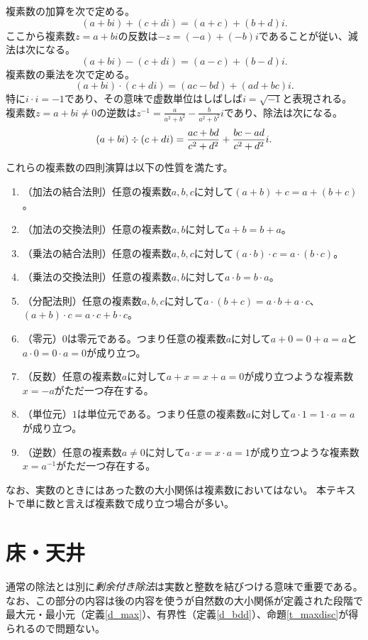 複素数の加算を次で定める。
$$
(a+b i)+(c+d i) = (a+c)+(b+d)i.
$$
ここから複素数$z = a+b i$の反数は$-z = (-a)+(-b)i$であることが従い、減法は次になる。
$$
(a+b i)-(c+d i) = (a-c)+(b-d)i.
$$
複素数の乗法を次で定める。
$$
(a+b i)\cdot(c+d i) = (a c-b d)+(a d+b c)i.
$$
特に$i\cdot i = -1$であり、その意味で虚数単位はしばしば$i = \sqrt{-1}$と表現される。
複素数$z = a+b i \ne 0$の逆数は$z^{-1} = \frac{a}{a^2+b^2}-\frac{b}{a^2+b^2}i$であり、除法は次になる。
$$
(a+b i)\divs(c+d i) = \frac{a c+b d}{c^2+d^2}+\frac{b c-a d}{c^2+d^2}i.
$$

これらの複素数の四則演算は以下の性質を満たす。
\begin{enumerate}
\item
（加法の結合法則）任意の複素数$a, b, c$に対して$(a+b)+c = a+(b+c)$。
\item
（加法の交換法則）任意の複素数$a, b$に対して$a+b = b+a$。
\item
（乗法の結合法則）任意の複素数$a, b, c$に対して$(a\cdot b)\cdot c = a\cdot (b\cdot c)$。
\item
（乗法の交換法則）任意の複素数$a, b$に対して$a\cdot b = b\cdot a$。
\item
（分配法則）任意の複素数$a, b, c$に対して$a\cdot (b+c) = a\cdot b+a\cdot c$、$(a+b)\cdot c = a\cdot c+b\cdot c$。
\item
（零元）$0$は零元である。つまり任意の複素数$a$に対して$a+0 = 0+a = a$と$a\cdot 0 = 0\cdot a = 0$が成り立つ。
\item
（反数）任意の複素数$a$に対して$a+x = x+a = 0$が成り立つような複素数$x = -a$がただ一つ存在する。
\item
（単位元）$1$は単位元である。つまり任意の複素数$a$に対して$a\cdot 1 = 1\cdot a = a$が成り立つ。
\item
（逆数）任意の複素数$a \ne 0$に対して$a\cdot x = x\cdot a = 1$が成り立つような複素数$x = a^{-1}$がただ一つ存在する。
\end{enumerate}


なお、実数のときにはあった数の大小関係は複素数においてはない。
本テキストで単に数と言えば複素数で成り立つ場合が多い。

\section{床・天井}

通常の除法とは別に\emph{剰余付き除法}は実数と整数を結びつける意味で重要である。
なお、この部分の内容は後の内容を使うが自然数の大小関係が定義された段階で最大元・最小元（定義\ref{d_max}）、有界性（定義\ref{d_bdd}）、命題\ref{t_maxdisc}が得られるので問題ない。

